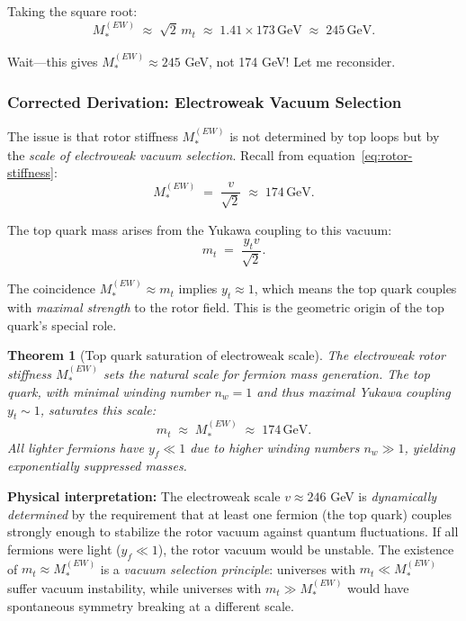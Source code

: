 \documentclass[11pt,a4paper]{article}
\theoremstyle{definition}
\theoremstyle{plain}
\newtheorem{theorem}{Theorem}
\theoremstyle{remark}
\begin{document}
Taking the square root:
\begin{equation}
\boxed{M_*^{(EW)} \;\approx\; \sqrt{2}\,m_t \;\approx\; 1.41 \times 173\,\text{GeV} \;\approx\; 245\,\text{GeV}.}
\label{eq:mt-connection-wrong}
\end{equation}

Wait---this gives $M_*^{(EW)} \approx 245$ GeV, not 174 GeV! Let me reconsider.

\subsubsection{Corrected Derivation: Electroweak Vacuum Selection}

The issue is that rotor stiffness $M_*^{(EW)}$ is not determined by top loops but by the \emph{scale of electroweak vacuum selection}. Recall from equation~\eqref{eq:rotor-stiffness}:
\begin{equation}
M_*^{(EW)} \;=\; \frac{v}{\sqrt{2}} \;\approx\; 174\,\text{GeV}.
\end{equation}

The top quark mass arises from the Yukawa coupling to this vacuum:
\begin{equation}
m_t \;=\; \frac{y_t v}{\sqrt{2}}.
\end{equation}

The coincidence $M_*^{(EW)} \approx m_t$ implies $y_t \approx 1$, which means the top quark couples with \emph{maximal strength} to the rotor field. This is the geometric origin of the top quark's special role.

\begin{theorem}[Top quark saturation of electroweak scale]
The electroweak rotor stiffness $M_*^{(EW)}$ sets the natural scale for fermion mass generation. The top quark, with minimal winding number $n_w = 1$ and thus maximal Yukawa coupling $y_t \sim 1$, saturates this scale:
\begin{equation}
m_t \;\approx\; M_*^{(EW)} \;\approx\; 174\,\text{GeV}.
\end{equation}
All lighter fermions have $y_f \ll 1$ due to higher winding numbers $n_w \gg 1$, yielding exponentially suppressed masses.
\end{theorem}

\textbf{Physical interpretation:} The electroweak scale $v \approx 246$ GeV is \emph{dynamically determined} by the requirement that at least one fermion (the top quark) couples strongly enough to stabilize the rotor vacuum against quantum fluctuations. If all fermions were light ($y_f \ll 1$), the rotor vacuum would be unstable. The existence of $m_t \approx M_*^{(EW)}$ is a \emph{vacuum selection principle}: universes with $m_t \ll M_*^{(EW)}$ suffer vacuum instability, while universes with $m_t \gg M_*^{(EW)}$ would have spontaneous symmetry breaking at a different scale.
\end{document}

